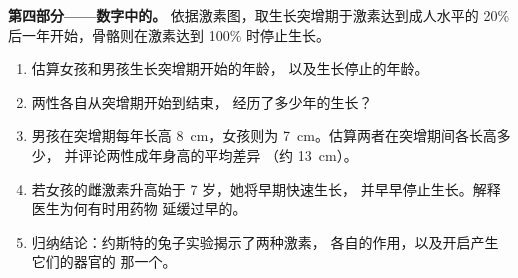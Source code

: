 \begin{problem}
\medskip
\noindent\textbf{第四部分——数字中的。}
依据激素图，取生长突增期于激素达到成人水平的
20\% 后一年开始，骨骼则在激素达到
100\% 时停止生长。
\begin{enumerate}[resume]
  \item 估算女孩和男孩生长突增期开始的年龄，
        以及生长停止的年龄。
  \item 两性各自从突增期开始到结束，
        经历了多少年的生长？
  \item 男孩在突增期每年长高 \qty{8}{cm}，女孩则为
        \qty{7}{cm}。估算两者在突增期间各长高多少，
        并评论两性成年身高的平均差异
        （约 \qty{13}{cm}）。
  \item 若女孩的雌激素升高始于 7 岁，她将早期快速生长，
        并早早停止生长。解释医生为何有时用药物
        延缓过早的。
  \item 归纳结论：约斯特的兔子实验揭示了两种激素，
        各自的作用，以及开启产生它们的器官的
        那一个。
\end{enumerate}
\end{problem}
